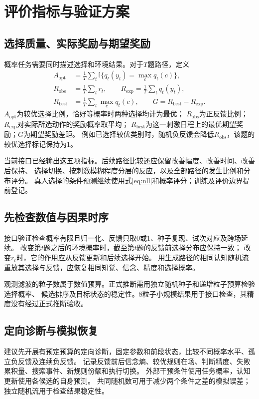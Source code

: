 \documentclass[11pt,a4paper]{article}
\numberwithin{equation}{section}
\newcommand{\ind}{\mathbb I}
\begin{document}
\section{评价指标与验证方案}
\label{sec:validation}

\subsection{选择质量、实际奖励与期望奖励}
概率任务需要同时描述选择和环境结果。对于$T$题路径，定义
\begin{subequations}\label{eq:metrics}
\begin{align}
A_{\mathrm{opt}}&=\frac1T\sum_t\ind\{q_t(y_t)=\max_c q_t(c)\},\\
R_{\mathrm{obs}}&=\frac1T\sum_t r_t,\qquad
R_{\mathrm{exp}}=\frac1T\sum_t q_t(y_t),\\
R_{\mathrm{best}}&=\frac1T\sum_t\max_c q_t(c),\qquad
G=R_{\mathrm{best}}-R_{\mathrm{exp}}.
\end{align}
\end{subequations}
$A_{\mathrm{opt}}$为较优选择比例，恰好等概率时两种选择均计为最优；
$R_{\mathrm{obs}}$为正反馈比例；$R_{\mathrm{exp}}$对实际所选动作的奖励概率取平均；
$R_{\mathrm{best}}$为这一刺激日程上的最优期望奖励；$G$为期望奖励差距。
例如已选择较优类别时，随机负反馈会降低$R_{\mathrm{obs}}$，该题的较优选择标记保持为1。

当前接口已经输出这五项指标。后续路径比较还应保留改善幅度、改善时间、改善后保持、
选择切换、按刺激模糊程度分层的反应，以及全部路径的发生比例和分布评分。
真人选择的条件预测继续使用式\eqref{eq:nll}和概率评分；训练及评价边界提前登记。

\subsection{先检查数值与因果时序}
接口验证检查概率有限且归一化、反馈只取0或1、种子复现、试次对应及跨场延续。
改变第$t$题之后的环境概率时，截至第$t$题的反馈前选择分布应保持一致；
改变$r_t$时，它的作用应从反馈更新和后续选择开始。
用生成路径的相同认知随机流重放其选择与反馈，应恢复相同知觉、信念、精度和选择概率。

观测滤波的粒子数属于数值预算。正式推断需用独立随机种子和递增粒子预算检验选择概率、
候选排序及目标状态的稳定性。8粒子小规模结果用于接口检查，其精度没有经过正式推断验收。

\subsection{定向诊断与模拟恢复}
建议先开展有预定预算的定向诊断，固定参数和前段状态，比较不同概率水平、孤立负反馈及连续负反馈。
记录反馈前后信念熵、较优规则在场、判断精度、失败累积量、搜索事件、新规则份额和执行切换。
外部干预条件使用任务概率，认知更新使用各候选的自身预测。
共同随机数可用于减少两个条件之差的模拟误差；独立随机流用于检查结果稳定性。
\end{document}
